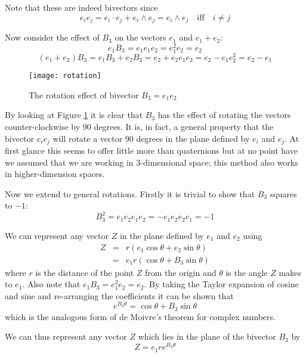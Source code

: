 Note that these are indeed bivectors since
\[
e_ie_j = e_i \cdot e_j + e_i \wedge e_j = e_i \wedge e_j \quad \mbox{iff} \quad i \ne j
\]

Now consider the effect of $B_3$ on the vectors $e_1$ and $e_1 + e_2$:
\begin{displaymath}
e_1B_3 = e_1e_1e_2 = e_1^2e_2=e_2 
\end{displaymath}
\begin{displaymath}
(e_1 + e_2)B_3 = e_1B_3 + e_2B_3 = e_2 + e_2e_1e_2 = e_2 - e_1e_2^2 = e_2 - e_1
\end{displaymath}

\begin{figure}
\centering
\texttt{[image: rotation]}
\caption{The rotation effect of bivector $B_3 = e_1e_2$\label{fig:rotation}}
\end{figure}

By looking at Figure \ref{fig:rotation} it is clear that $B_3$ has the
effect of rotating the vectors counter-clockwise by 90 degrees. It is, in
fact, a general property that the bivector $e_ie_j$ will rotate a
vector 90 degrees in the plane defined by $e_i$ and $e_j$. At first 
glance this seems to offer little more than quaternions but at no point 
have we assumed that we are working in 3-dimensional space; this method
also works in higher-dimension spaces.

Now we extend to general rotations. Firstly it is trivial to
show that $B_3$ squares to $-1$:
\begin{displaymath}
B_3^2 = e_1e_2e_1e_2 = -e_1e_2e_2e_1 = -1
\end{displaymath}

We can represent any vector $Z$ in the plane defined by $e_1$ and
$e_2$ using
\begin{eqnarray*}
Z & = & r ( e_1 \cos \theta + e_2 \sin \theta) \\
  & = & e_1 r ( \cos \theta + B_3 \sin \theta)
\end{eqnarray*}
where $r$ is the distance of the point $Z$ from the origin
and $\theta$ is the angle $Z$ makes to $e_1$. Also note
that $e_1B_3 = e_1^2e_2 = e_2$. By taking the Taylor expansion of cosine
and sine and re-arranging the coefficients it can be shown that
\[
e^{B_3\theta} = \cos \theta + B_3 \sin \theta
\]
which is the analogous form of de Moivre's theorem for complex
numbers.

We can thus represent any vector $Z$ which lies in the plane of the
bivector $B_3$ by
\[
Z=e_1re^{B_3\theta}
\]

